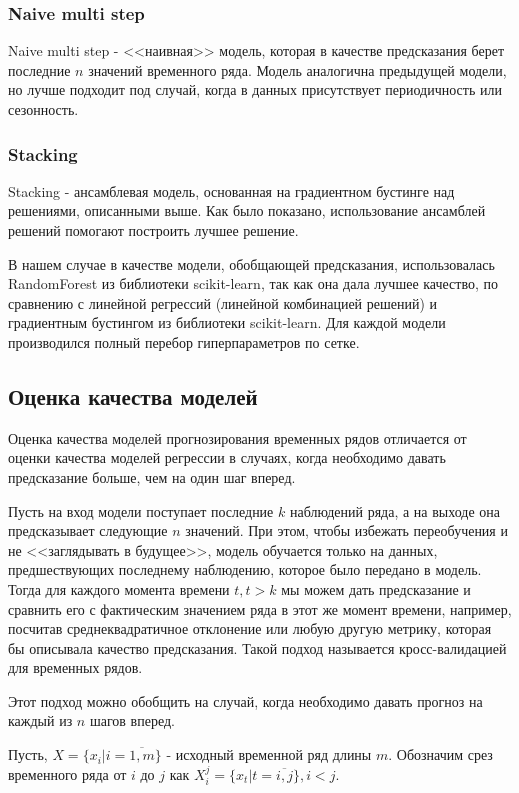 \documentclass[a4paper,article,14pt]{extarticle}
\begin{document}
\subsubsection{Naive multi step}
Naive multi step - <<наивная>> модель, которая в качестве предсказания берет последние $n$ значений временного ряда.
Модель аналогична предыдущей модели, но лучше подходит под случай, когда в данных присутствует периодичность или сезонность.

\subsubsection{Stacking}
Stacking - ансамблевая модель, основанная на градиентном бустинге над решениями, описанными выше.
Как было показано, использование ансамблей решений помогают построить лучшее решение.
\par
В нашем случае в качестве модели, обобщающей предсказания, использовалась RandomForest из библиотеки scikit-learn, так как она дала лучшее качество, по сравнению с линейной регрессий (линейной комбинацией решений) и градиентным бустингом из библиотеки scikit-learn.
Для каждой модели производился полный перебор гиперпараметров по сетке.

\subsection{Оценка качества моделей}

Оценка качества моделей прогнозирования временных рядов отличается от оценки качества моделей регрессии в случаях, когда необходимо давать предсказание больше, чем на один шаг вперед.
\par
Пусть на вход модели поступает последние $k$ наблюдений ряда, а на выходе она предсказывает следующие $n$ значений.
При этом, чтобы избежать переобучения и не <<заглядывать в будущее>>, модель обучается только на данных, предшествующих последнему наблюдению, которое было передано в модель.
Тогда для каждого момента времени $t, t > k$ мы можем дать предсказание и сравнить его с фактическим значением ряда в этот же момент времени, например, посчитав среднеквадратичное отклонение или любую другую метрику, которая бы описывала качество предсказания.
Такой подход называется кросс-валидацией для временных рядов.
\par
Этот подход можно обобщить на случай, когда необходимо давать прогноз на каждый из $n$ шагов вперед.

Пусть, $X = \{x_i | i= \overline{1,m} \}$ - исходный временной ряд длины $m$.
Обозначим срез временного ряда от $i$ до $j$ как $X^j_i = \{x_t | t= \overline{i,j} \}, i < j$.
\end{document}

